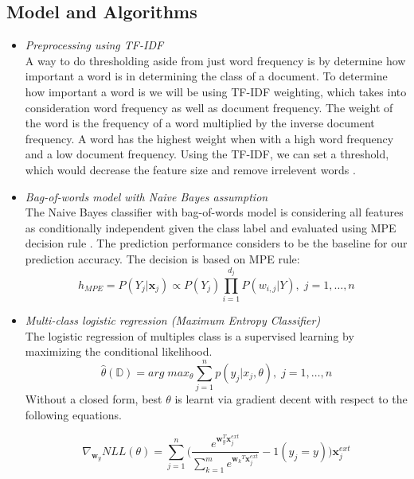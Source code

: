 \documentclass[10pt,twocolumn,letterpaper]{article}
\begin{document}
\subsection{Model and Algorithms}\label{model}
\begin{itemize}
	\item \textit{ Preprocessing using TF-IDF} \\
	A way to do thresholding aside from just word frequency is by determine how important a word is in determining the class of a document. To determine how important a word is we will be using TF-IDF  weighting, which takes into consideration word frequency as well as document frequency. The weight of the word is the frequency of a word multiplied by the inverse document frequency. A word has the highest weight when with a high word frequency and a low document frequency. Using the TF-IDF, we can set a threshold, which would decrease the feature size and remove irrelevent words \cite{schutze2008introduction}.
	\newpage
	\item \textit{Bag-of-words model with Naive Bayes assumption}\\
	 The Naive Bayes classifier with bag-of-words model is considering all features as conditionally independent given the class label and evaluated using MPE decision rule \cite{ishwarspring18}. The prediction performance considers to be the baseline for our prediction accuracy. 
	The decision is based on MPE rule:
	\[h_{MPE} = P(Y_j|\pmb{x}_j) \propto P(Y_j)\prod^{d_j}_{i=1}P(w_{i,j}|Y), \;j = 1,\ldots,n\]
	\item \textit{Multi-class logistic regression (Maximum Entropy Classifier)} \\
	The logistic regression of multiples class is a supervised learning by maximizing the conditional likelihood.
	\[\hat{\theta}(\mathbb{D}) = arg \; max_\theta \sum_{j=1}^{n}p(y_j|x_j,\theta), \;j = 1,\ldots,n\]Without a closed form, best $\theta$ is learnt via gradient decent with respect to the following equations. 
	
	\[\nabla_{\pmb{w}_y}NLL(\theta) = \sum_{j=1}^{n}\bigg(\frac{e^{\pmb{w}_y^T\pmb{x}_j^{ext}}}{\sum_{k=1}^{m}e^{{\pmb{w}_k}^T\pmb{x}_j^{ext}}}-1(y_j = y)\bigg)\pmb{x}^{ext}_{j}\]
	

\end{itemize}
\end{document}
